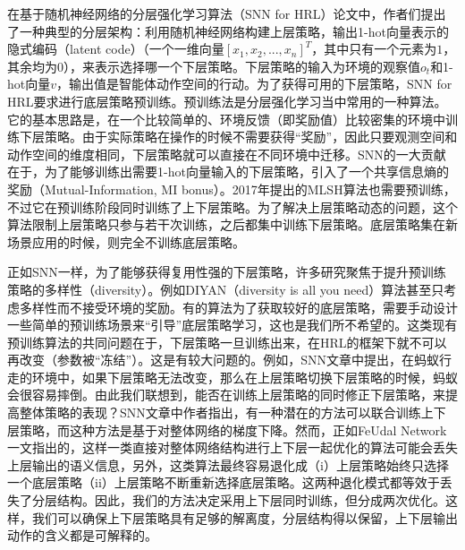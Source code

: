 在基于随机神经网络的分层强化学习算法（SNN for HRL\cite{SNN4hrl}）论文中，作者们提出了一种典型的分层架构：利用随机神经网络构建上层策略，输出1-hot向量表示的隐式编码（latent code）（一个一维向量$[x_1, x_2, ..., x_n]^T$，其中只有一个元素为$1$，其余均为$0$），来表示选择哪一个下层策略。下层策略的输入为环境的观察值$o_t$和1-hot向量$v$，输出值是智能体动作空间的行动。为了获得可用的下层策略，SNN for HRL要求进行底层策略预训练。预训练法是分层强化学习当中常用的一种算法。它的基本思路是，在一个比较简单的、环境反馈（即奖励值）比较密集的环境中训练下层策略。由于实际策略在操作的时候不需要获得``奖励''，因此只要观测空间和动作空间的维度相同，下层策略就可以直接在不同环境中迁移。SNN的一大贡献在于，为了能够训练出需要1-hot向量输入的下层策略，引入了一个共享信息熵的奖励（Mutual-Information, MI bonus）。2017年提出的MLSH算法\cite{MLSH}也需要预训练，不过它在预训练阶段同时训练了上下层策略。为了解决上层策略动态的问题，这个算法限制上层策略只参与若干次训练，之后都集中训练下层策略。底层策略集在新场景应用的时候，则完全不训练底层策略。

正如SNN一样，为了能够获得复用性强的下层策略，许多研究聚焦于提升预训练策略的多样性（diversity）\cite{DIYAN, Learning_and_Transfer_of_Modulated_Locomotor_Controllers}。例如DIYAN（diversity is all you need）算法甚至只考虑多样性而不接受环境的奖励。有的算法\cite{Learning_and_Transfer_of_Modulated_Locomotor_Controllers}为了获取较好的底层策略，需要手动设计一些简单的预训练场景来``引导''底层策略学习，这也是我们所不希望的。这类现有预训练算法的共同问题在于，下层策略一旦训练出来，在HRL的框架下就不可以再改变（参数被``冻结''）。这是有较大问题的。例如，SNN文章中提出，在蚂蚁行走的环境中，如果下层策略无法改变，那么在上层策略切换下层策略的时候，蚂蚁会很容易摔倒。由此我们联想到，能否在训练上层策略的同时修正下层策略，来提高整体策略的表现？SNN文章中作者指出，有一种潜在的方法可以联合训练上下层策略，而这种方法是基于对整体网络的梯度下降\cite{categorical_gradient}。然而，正如FeUdal Network\cite{feudal}一文指出的，这样一类直接对整体网络结构进行上下层一起优化的算法可能会丢失上层输出的语义信息，另外，这类算法最终容易退化成（i）上层策略始终只选择一个底层策略（ii）上层策略不断重新选择底层策略。这两种退化模式都等效于丢失了分层结构。因此，我们的方法决定采用上下层同时训练，但分成两次优化。这样，我们可以确保上下层策略具有足够的解离度，分层结构得以保留，上下层输出动作的含义都是可解释的。
    
